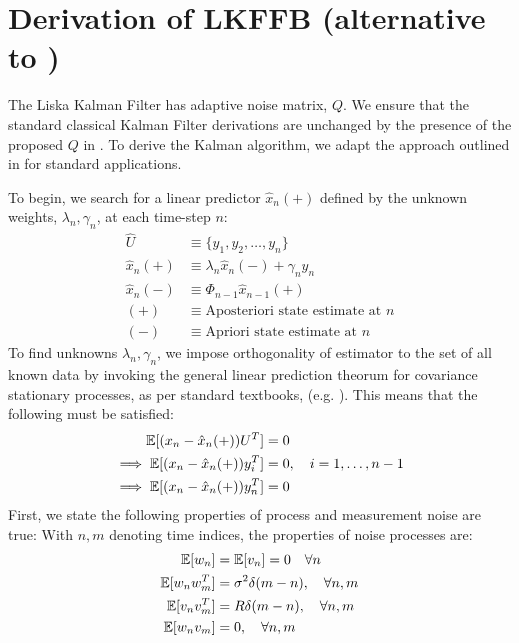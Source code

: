 \newpage
\section{Derivation of LKFFB (alternative to \cite{livska2007})} \label{sec:ap_liska_deriv}
The Liska Kalman Filter has adaptive noise matrix, $Q$. We ensure that the standard classical  Kalman Filter derivations are unchanged by the presence of the proposed $Q$ in \cite{livska2007}. To derive the Kalman algorithm, we adapt the approach outlined in \cite{grewal2001theory} for standard applications. 

To begin, we search for a linear predictor $\hat{x}_n(+)$ defined by the unknown weights, $\lambda_n, \gamma_n$, at each time-step $n$:
\begin{align}
\hat{U} & \equiv \{y_1, y_2,\dots, y_n\} \\
\hat{x}_n(+) & \equiv \lambda_n \hat{x}_n(-) + \gamma_n y_n \label{eqn:KF_predictor}\\
\hat{x}_n(-) & \equiv \Phi_{n-1} \hat{x}_{n-1}(+) \\
(+) &\equiv \text{Aposteriori state estimate at $n$}\\
(-) &\equiv \text{Apriori state estimate at $n$}
\end{align}
To find unknowns $\lambda_n, \gamma_n$, we impose orthogonality of estimator to the set of all known data by invoking the general linear prediction theorum for covariance stationary processes, as per standard textbooks, (e.g. \cite{grewal2001theory,karlin2012first}). This means that the following must be satisfied:
\begin{align}
\mathbb{E}[(x_n - \hat{x}_n(+))U^T] &= 0 \label{eqn:KF_reln_1}\\
\implies \mathbb{E}[(x_n - \hat{x}_n(+))y_i^T] &= 0, \quad i = 1,\dots, n-1 \label{eqn:KF_reln_2}\\
\implies \mathbb{E}[(x_n - \hat{x}_n(+))y_n^T] &= 0 \label{eqn:KF_reln_3}
\end{align}
First, we state the following properties of process and measurement noise are true:
With $n,m$ denoting time indices, the properties of noise processes are:
\begin{align}
\mathbb{E}[w_n] & = \mathbb{E}[v_n]= 0 \quad \forall n \label{eqn:KF_stat_noisemean}\\
\mathbb{E}[w_nw_m^T] &= \sigma^2 \delta(m-n),  \quad \forall n,m \label{eqn:KF_stat_noisepros}\\
\mathbb{E}[v_n v_m^T]&= R\delta(m-n), \quad  \forall n,m  \label{eqn:KF_stat_noisemsmt} \\
\mathbb{E}[w_n v_m] &= 0,  \quad \forall n,m \label{eqn:KF_stat_crosscorr}
\end{align} 
